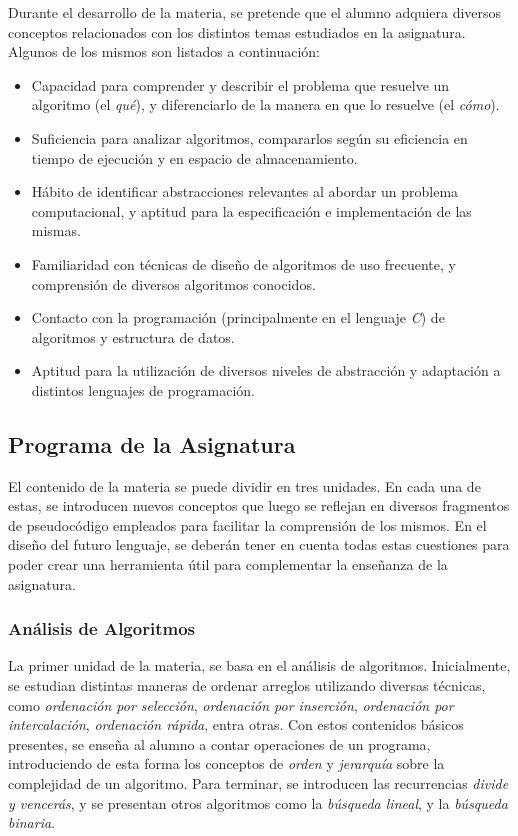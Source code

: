 Durante el desarrollo de la materia, se pretende que el alumno adquiera diversos conceptos relacionados con los distintos temas estudiados en la asignatura.
Algunos de los mismos son listados a continuación:
\begin{itemize}
    \item Capacidad para comprender y describir el problema que resuelve un algoritmo (el \textit{qué}), y diferenciarlo de la manera en que lo resuelve (el \textit{cómo}).
    \item Suficiencia para analizar algoritmos, compararlos según su eficiencia en tiempo de ejecución y en espacio de almacenamiento.
    \item Hábito de identificar abstracciones relevantes al abordar un problema computacional, y aptitud para la especificación e implementación de las mismas.
    \item Familiaridad con técnicas de diseño de algoritmos de uso frecuente, y comprensión de diversos algoritmos conocidos.
    \item Contacto con la programación (principalmente en el lenguaje \textit{C}) de algoritmos y estructura de datos.
    \item Aptitud para la utilización de diversos niveles de abstracción y adaptación a distintos lenguajes de programación.
\end{itemize}

\subsection{Programa de la Asignatura}

El contenido de la materia se puede dividir en tres unidades.
En cada una de estas, se introducen nuevos conceptos que luego se reflejan en diversos fragmentos de pseudocódigo empleados para facilitar la comprensión de los mismos.
En el diseño del futuro lenguaje, se deberán tener en cuenta todas estas cuestiones para poder crear una herramienta útil para complementar la enseñanza de la asignatura.

\subsubsection{Análisis de Algoritmos}

La primer unidad de la materia, se basa en el análisis de algoritmos.
Inicialmente, se estudian distintas maneras de ordenar arreglos utilizando diversas técnicas, como \textit{ordenación por selección}, \textit{ordenación por inserción}, \textit{ordenación por intercalación}, \textit{ordenación rápida}, entra otras.
Con estos contenidos básicos presentes, se enseña al alumno a contar operaciones de un programa, introduciendo de esta forma los conceptos de \textit{orden} y \textit{jerarquía} sobre la complejidad de un algoritmo.
Para terminar, se introducen las recurrencias \textit{divide y vencerás}, y se presentan otros algoritmos como la \textit{búsqueda lineal}, y la \textit{búsqueda binaria}.

